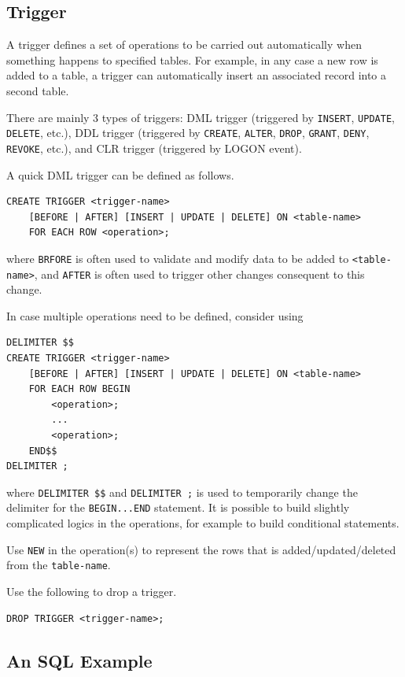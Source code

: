 \subsection{Trigger}

A trigger defines a set of operations to be carried out automatically when something happens to specified tables. For example, in any case a new row is added to a table, a trigger can automatically insert an associated record into a second table.

There are mainly 3 types of triggers: DML trigger (triggered by \verb|INSERT|, \verb|UPDATE|, \verb|DELETE|, etc.), DDL trigger (triggered by \verb|CREATE|, \verb|ALTER|, \verb|DROP|, \verb|GRANT|, \verb|DENY|, \verb|REVOKE|, etc.), and CLR trigger (triggered by LOGON event).

A quick DML trigger can be defined as follows.
\begin{lstlisting}
CREATE TRIGGER <trigger-name>
    [BEFORE | AFTER] [INSERT | UPDATE | DELETE] ON <table-name>
    FOR EACH ROW <operation>;
\end{lstlisting}
where \verb|BRFORE| is often used to validate and modify data to be added to \verb|<table-name>|, and \verb|AFTER| is often used to trigger other changes consequent to this change.

In case multiple operations need to be defined, consider using
\begin{lstlisting}
DELIMITER $$
CREATE TRIGGER <trigger-name>
    [BEFORE | AFTER] [INSERT | UPDATE | DELETE] ON <table-name>
    FOR EACH ROW BEGIN
        <operation>;
        ...
        <operation>;
    END$$
DELIMITER ;
\end{lstlisting}
where \verb|DELIMITER $$| and \verb|DELIMITER ;| is used to temporarily change the delimiter for the \verb|BEGIN...END| statement. It is possible to build slightly complicated logics in the operations, for example to build conditional statements.

Use \verb|NEW| in the operation(s) to represent the rows that is added/updated/deleted from the \verb|table-name|.

Use the following to drop a trigger.
\begin{lstlisting}
DROP TRIGGER <trigger-name>;
\end{lstlisting}

\subsection{An SQL Example}

